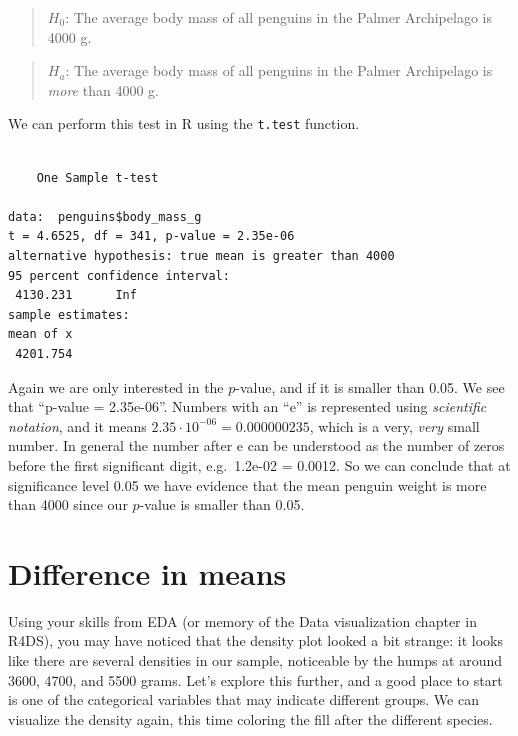 \documentclass[
  letterpaper,
  DIV=11,
  numbers=noendperiod]{scrreprt}
\newenvironment{Shaded}{\begin{snugshade}}{\end{snugshade}}
\newcommand{\AttributeTok}[1]{\textcolor[rgb]{0.40,0.45,0.13}{#1}}
\newcommand{\DecValTok}[1]{\textcolor[rgb]{0.68,0.00,0.00}{#1}}
\newcommand{\FunctionTok}[1]{\textcolor[rgb]{0.28,0.35,0.67}{#1}}
\newcommand{\NormalTok}[1]{\textcolor[rgb]{0.00,0.23,0.31}{#1}}
\newcommand{\SpecialCharTok}[1]{\textcolor[rgb]{0.37,0.37,0.37}{#1}}
\newcommand{\StringTok}[1]{\textcolor[rgb]{0.13,0.47,0.30}{#1}}
\begin{document}
\begin{quote}
\textbf{\(H_0\)}: The average body mass of all penguins in the Palmer
Archipelago is 4000 g.
\end{quote}

\begin{quote}
\textbf{\(H_a\)}: The average body mass of all penguins in the Palmer
Archipelago is \emph{more} than 4000 g.
\end{quote}

We can perform this test in R using the \texttt{t.test} function.

\begin{Shaded}
\end{Shaded}

\begin{verbatim}

    One Sample t-test

data:  penguins$body_mass_g
t = 4.6525, df = 341, p-value = 2.35e-06
alternative hypothesis: true mean is greater than 4000
95 percent confidence interval:
 4130.231      Inf
sample estimates:
mean of x 
 4201.754 
\end{verbatim}

Again we are only interested in the \(p\)-value, and if it is smaller
than 0.05. We see that ``p-value = 2.35e-06''. Numbers with an ``e'' is
represented using \emph{scientific notation}, and it means
\(2.35 \cdot 10^{-06} = 0.000000235\), which is a very, \emph{very}
small number. In general the number after e can be understood as the
number of zeros before the first significant digit, e.g.~1.2e-02 =
0.0012. So we can conclude that at significance level 0.05 we have
evidence that the mean penguin weight is more than 4000 since our
\(p\)-value is smaller than 0.05.

\section{Difference in means}\label{difference-in-means}

Using your skills from EDA (or memory of the Data visualization chapter
in R4DS), you may have noticed that the density plot looked a bit
strange: it looks like there are several densities in our sample,
noticeable by the humps at around 3600, 4700, and 5500 grams. Let's
explore this further, and a good place to start is one of the
categorical variables that may indicate different groups. We can
visualize the density again, this time coloring the fill after the
different species.
\end{document}
